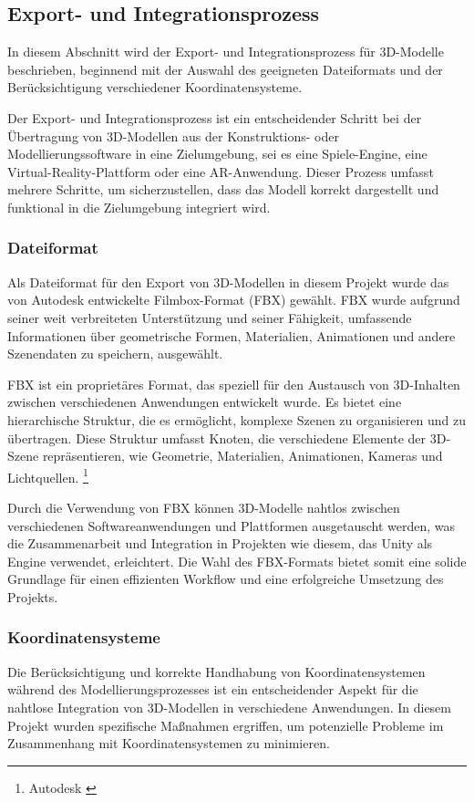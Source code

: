 \subsection{Export- und Integrationsprozess}
In diesem Abschnitt wird der Export- und Integrationsprozess für 3D-Modelle beschrieben, beginnend mit der Auswahl des
geeigneten Dateiformats und der Berücksichtigung verschiedener Koordinatensysteme.

Der Export- und Integrationsprozess ist ein entscheidender Schritt bei der Übertragung von 3D-Modellen aus der Konstruktions-
oder Modellierungssoftware in eine Zielumgebung, sei es eine Spiele-Engine, eine Virtual-Reality-Plattform oder eine AR-Anwendung.
Dieser Prozess umfasst mehrere Schritte, um sicherzustellen, dass das Modell korrekt dargestellt und funktional in die
Zielumgebung integriert wird.

\subsubsection{Dateiformat}
Als Dateiformat für den Export von 3D-Modellen in diesem Projekt wurde das von Autodesk entwickelte Filmbox-Format (FBX)
gewählt. FBX wurde aufgrund seiner weit verbreiteten Unterstützung und seiner Fähigkeit, umfassende Informationen über
geometrische Formen, Materialien, Animationen und andere Szenendaten zu speichern, ausgewählt.

FBX ist ein proprietäres Format, das speziell für den Austausch von 3D-Inhalten zwischen verschiedenen Anwendungen
entwickelt wurde. Es bietet eine hierarchische Struktur, die es ermöglicht, komplexe Szenen zu organisieren und zu
übertragen. Diese Struktur umfasst Knoten, die verschiedene Elemente der 3D-Szene repräsentieren, wie Geometrie,
Materialien, Animationen, Kameras und Lichtquellen. \footnote{Autodesk \cite{FBX. Getting started}}

Durch die Verwendung von FBX können 3D-Modelle nahtlos zwischen verschiedenen Softwareanwendungen und Plattformen
ausgetauscht werden, was die Zusammenarbeit und Integration in Projekten wie diesem, das Unity als Engine verwendet,
erleichtert. Die Wahl des FBX-Formats bietet somit eine solide Grundlage für einen effizienten Workflow und eine
erfolgreiche Umsetzung des Projekts.

\subsubsection{Koordinatensysteme}
Die Berücksichtigung und korrekte Handhabung von Koordinatensystemen während des Modellierungsprozesses ist ein
entscheidender Aspekt für die nahtlose Integration von 3D-Modellen in verschiedene Anwendungen. In diesem Projekt
wurden spezifische Maßnahmen ergriffen, um potenzielle Probleme im Zusammenhang mit Koordinatensystemen zu minimieren.

